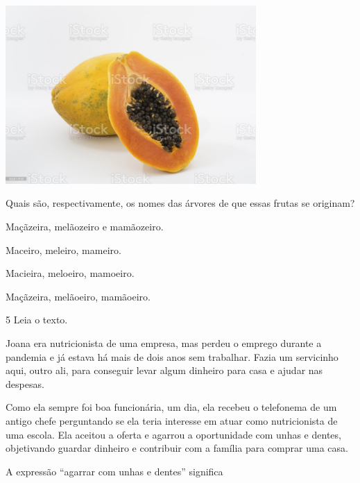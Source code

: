 
\includegraphics[width=3.76501in,height=2.67500in]{./media/image40.jpeg}

Quais são, respectivamente, os nomes das árvores de que essas frutas se originam?

\begin{escolha}
\item Maçãzeira, melãozeiro e mamãozeiro.

\item Maceiro, meleiro, mameiro.

\item Macieira, meloeiro, mamoeiro.

\item Maçãzeira, melãoeiro, mamãoeiro.
\end{escolha}

\num{5} Leia o texto.

\begin{myquote}
Joana era nutricionista de uma empresa, mas perdeu o emprego durante a
pandemia e já estava há mais de dois anos sem trabalhar. Fazia um
servicinho aqui, outro ali, para conseguir levar algum dinheiro para
casa e ajudar nas despesas.

Como ela sempre foi boa funcionária, um dia, ela recebeu o telefonema de
um antigo chefe perguntando se ela teria interesse em atuar como
nutricionista de uma escola. Ela aceitou a oferta e agarrou a
oportunidade com unhas e dentes, objetivando guardar dinheiro e
contribuir com a família para comprar uma casa.

\end{myquote}

A expressão ``agarrar com unhas e dentes'' significa

